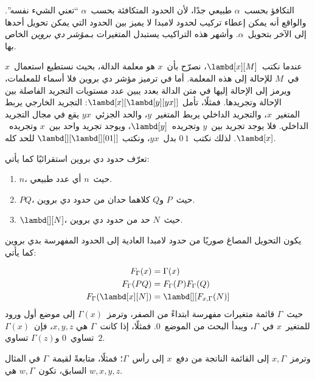 \documentclass[../../../include/open-logic-section]{subfiles}
\begin{document}


التكافؤ بحسب~$\alpha$ طبيعي جدًا، لأن الحدود المتكافئة بحسب~$\alpha$
``تعني الشيء نفسه''. والواقع أنه يمكن إعطاء تركيب لحدود لامبدا لا يميز
بين الحدود التي يمكن تحويل أحدها إلى الآخر بتحويل~$\alpha$. وأشهر هذه
التراكيب يستبدل المتغيرات بـ\emph{مؤشر دي بروين} الخاص بها.

عندما نكتب~$\lambd[x][M]$، نصرّح بأن~$x$ هو معلمة الدالة، بحيث نستطيع
استعمال~$x$ في~$M$ للإحالة إلى هذه المعلمة. أما في ترميز مؤشر دي بروين
فلا أسماء للمعلمات، ويرمز إلى الإحالة إليها في متن الدالة بعدد يبين عدد
مستويات التجريد الفاصلة بين الإحالة وتجريدها. فمثلًا، تأمل
$\lambd[x][\lambd[y][y x]]$: التجريد الخارجي يربط المتغير~$x$، والتجريد
الداخلي يربط المتغير~$y$، والحد الجزئي~$y x$ يقع في مجال التجريد
الداخلي. فلا يوجد تجريد بين~$y$ وتجريده~$\lambd[y]$، ويوجد تجريد واحد
بين~$x$ وتجريده~$\lambd[x]$. لذلك نكتب~$0\, 1$ بدل~$y x$، ونكتب
$\lambd[][\lambd[][01]]$ للحد كله.

\begin{defn}
  تعرّف حدود دي بروين استقرائيًا كما يأتي:
  \begin{enumerate}
  \item $n$، حيث~$n$ أي عدد طبيعي.
  \item $PQ$، حيث~$P$ و$Q$ كلاهما حدان من حدود دي بروين.
  \item $\lambd[][N]$، حيث~$N$ حد من حدود دي بروين.
  \end{enumerate}
\end{defn}

يكون التحويل المصاغ صوريًا من حدود لامبدا العادية إلى الحدود المفهرسة
بدي بروين كما يأتي:
\begin{defn}
  \begin{align*}
    F_\Gamma(x) &= \Gamma(x) \\
    F_\Gamma(PQ) &= F_\Gamma(P)F_\Gamma(Q) \\
    F_\Gamma(\lambd[x][N]) &= \lambd[][F_{x,\Gamma}(N)]
  \end{align*}
  حيث~$\Gamma$ قائمة متغيرات مفهرسة ابتداءً من الصفر، وترمز~$\Gamma(x)$
  إلى موضع أول ورود للمتغير~$x$ في~$\Gamma$، ويبدأ البحث من الموضع~$0$.
  فمثلًا، إذا كانت~$\Gamma$ هي
  $x,y,z$، فإن~$\Gamma(x)$ تساوي~$0$ و$\Gamma(z)$ تساوي~$2$.
  
  وترمز~$x,\Gamma$ إلى القائمة الناتجة من دفع~$x$ إلى رأس~$\Gamma$؛
  فمثلًا، متابعةً لقيمة~$\Gamma$ في المثال السابق، تكون~$w,\Gamma$ هي
  $w,x,y,z$.
\end{defn}
\end{document}
